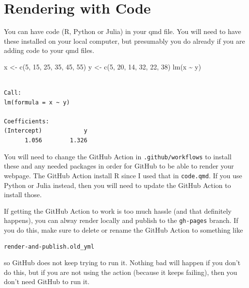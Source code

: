 \documentclass[
  letterpaper,
  oneside,
  open=any]{scrbook}
\newenvironment{Shaded}{\begin{snugshade}}{\end{snugshade}}
\newcommand{\DecValTok}[1]{\textcolor[rgb]{0.68,0.00,0.00}{#1}}
\newcommand{\FunctionTok}[1]{\textcolor[rgb]{0.28,0.35,0.67}{#1}}
\newcommand{\NormalTok}[1]{\textcolor[rgb]{0.00,0.23,0.31}{#1}}
\newcommand{\OtherTok}[1]{\textcolor[rgb]{0.00,0.23,0.31}{#1}}
\newcommand{\SpecialCharTok}[1]{\textcolor[rgb]{0.37,0.37,0.37}{#1}}
\begin{document}

\hypertarget{rendering-with-code}{%
\chapter{Rendering with Code}\label{rendering-with-code}}

You can have code (R, Python or Julia) in your qmd file. You will need
to have these installed on your local computer, but presumably you do
already if you are adding code to your qmd files.

\begin{Shaded}
\begin{Highlighting}[]
\NormalTok{x }\OtherTok{\textless{}{-}} \FunctionTok{c}\NormalTok{(}\DecValTok{5}\NormalTok{, }\DecValTok{15}\NormalTok{, }\DecValTok{25}\NormalTok{, }\DecValTok{35}\NormalTok{, }\DecValTok{45}\NormalTok{, }\DecValTok{55}\NormalTok{)}
\NormalTok{y }\OtherTok{\textless{}{-}} \FunctionTok{c}\NormalTok{(}\DecValTok{5}\NormalTok{, }\DecValTok{20}\NormalTok{, }\DecValTok{14}\NormalTok{, }\DecValTok{32}\NormalTok{, }\DecValTok{22}\NormalTok{, }\DecValTok{38}\NormalTok{)}
\FunctionTok{lm}\NormalTok{(x }\SpecialCharTok{\textasciitilde{}}\NormalTok{ y)}
\end{Highlighting}
\end{Shaded}

\begin{verbatim}

Call:
lm(formula = x ~ y)

Coefficients:
(Intercept)            y  
      1.056        1.326  
\end{verbatim}

You will need to change the GitHub Action in \texttt{.github/workflows}
to install these and any needed packages in order for GitHub to be able
to render your webpage. The GitHub Action install R since I used that in
\texttt{code.qmd}. If you use Python or Julia instead, then you will
need to update the GitHub Action to install those.

If getting the GitHub Action to work is too much hassle (and that
definitely happens), you can alway render locally and publish to the
\texttt{gh-pages} branch. If you do this, make sure to delete or rename
the GitHub Action to something like

\begin{verbatim}
render-and-publish.old_yml
\end{verbatim}

so GitHub does not keep trying to run it. Nothing bad will happen if you
don't do this, but if you are not using the action (because it keeps
failing), then you don't need GitHub to run it.
\end{document}
